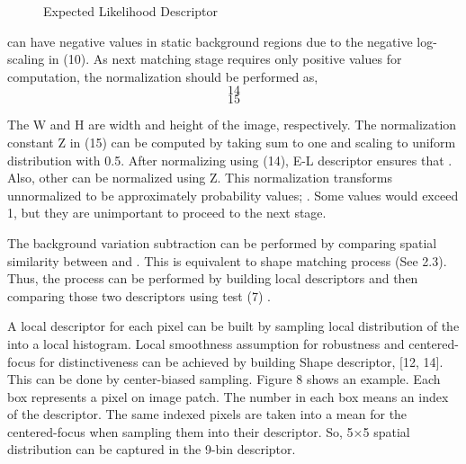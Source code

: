 \documentclass[a4paper,twocolumn, 10pt]{article}
\begin{document}
\begin{figure}[t]
  \centering
  \label{fig70}
  \hfill
  \hfill
  \caption{Expected Likelihood Descriptor}
\end{figure}
  can have negative values in static background regions due to the negative log-scaling in (10). As next matching stage requires only positive values for computation, the normalization should be performed as,
\begin{equation}
  14
\end{equation}
\begin{equation}
  15
\end{equation}

The W and H are width and height of the image, respectively. The normalization constant Z in (15) can be computed by taking sum to one and scaling to uniform distribution with 0.5. After normalizing   using (14), E-L descriptor ensures that  . Also, other   can be normalized using Z. This normalization transforms unnormalized   to be approximately probability values;  . Some values would exceed 1, but they are unimportant to proceed to the next stage.

The background variation subtraction can be performed by comparing spatial similarity between   and  . This is equivalent to shape matching process (See 2.3). Thus, the process can be performed by building local descriptors and then comparing those two descriptors using   test (7) .

A local descriptor for each pixel can be built by sampling local distribution of the   into a local histogram. Local smoothness assumption for robustness and centered-focus for distinctiveness can be achieved by building Shape descriptor, [12, 14]. This can be done by center-biased sampling. Figure 8 shows an example. Each box represents a pixel on image patch. The number in each box means an index of the descriptor. The same indexed pixels are taken into a mean for the centered-focus when sampling them into their descriptor. So, 5×5 spatial distribution can be captured in the 9-bin descriptor. 
\end{document}
